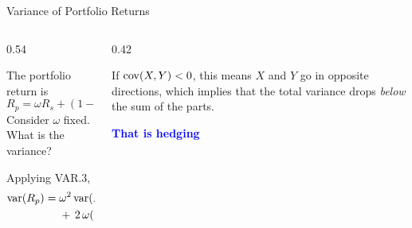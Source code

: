 \documentclass[9pt,english,aspectratio=169]{beamer}
\begin{document}
\begin{frame}{Variance of Portfolio Returns}

  \begin{columns}[T]
    \begin{column}{0.54\textwidth}

      \begin{questionbox}
        The portfolio return is
          \[
            R_p = \omega R_s + (1 - \omega) R_b.
          \]
        Consider $\omega$ fixed. What is the variance?
      \end{questionbox}
      \pause
      \vspace{0.5em}
      \begin{answerbox}
        Applying VAR.3,
        \begin{align*}
          \operatorname{var}(R_p) = \;& \omega^2 \operatorname{var}(R_s) + (1 - \omega)^2 \operatorname{var}(R_b) \\
                        & + \, 2\,\omega(1 - \omega)\, \operatorname{cov}(R_s, R_b).
        \end{align*}
      \end{answerbox}
    \end{column}
    \begin{column}{0.42\textwidth}
      \vspace{12em}
        \begin{insightbox}
          If $\operatorname{cov}(X, Y) < 0$, this means $X$ and $Y$
          go in opposite directions, which implies that 
          the total variance drops \emph{below} the sum of the parts.
        \end{insightbox}
        \textcolor{blue}{\textbf{That is hedging}}
    \end{column}
  \end{columns}

\end{frame}
\end{document}
